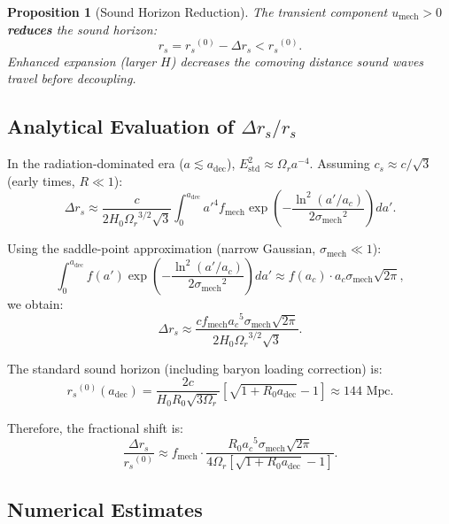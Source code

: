 \documentclass[11pt,a4paper]{article}
\newcommand{\cs}{\ensuremath{c_s}}
\newcommand{\umech}{\ensuremath{u_{\mathrm{mech}}}}
\newcommand{\fmech}{\ensuremath{f_{\mathrm{mech}}}}
\newcommand{\ac}{\ensuremath{a_c}}
\newcommand{\sigmamech}{\ensuremath{\sigma_{\mathrm{mech}}}}
\newcommand{\adec}{\ensuremath{a_{\mathrm{dec}}}}
\newcommand{\rs}{\ensuremath{r_s}}
\newcommand{\Omr}{\ensuremath{\Omega_r}}
\newtheorem{proposition}[theorem]{Proposition}
\theoremstyle{definition}
\theoremstyle{remark}
\begin{document}
\begin{proposition}[Sound Horizon Reduction]
\label{prop:rs_reduction}
The transient component $\umech > 0$ \textbf{reduces} the sound horizon:
\begin{equation}
\rs = \rs^{(0)} - \Delta\rs < \rs^{(0)}.
\end{equation}
Enhanced expansion (larger $H$) decreases the comoving distance sound waves travel before decoupling.
\end{proposition}

\subsection{Analytical Evaluation of $\Delta\rs/\rs$}
\label{sec:analytical_Deltars}

In the radiation-dominated era ($a \lesssim \adec$), $E_{\mathrm{std}}^2 \approx \Omr a^{-4}$. Assuming $\cs \approx c/\sqrt{3}$ (early times, $R \ll 1$):
\begin{equation}
\Delta\rs \approx \frac{c}{2H_0\Omr^{3/2}\sqrt{3}} \int_0^{\adec} a'^4 \fmech \exp\left( -\frac{\ln^2(a'/\ac)}{2\sigmamech^2} \right) da'.
\end{equation}

Using the saddle-point approximation (narrow Gaussian, $\sigmamech \ll 1$):
\begin{equation}
\int_0^{\adec} f(a') \exp\left( -\frac{\ln^2(a'/\ac)}{2\sigmamech^2} \right) da' \approx f(\ac) \cdot \ac \sigmamech \sqrt{2\pi},
\end{equation}
we obtain:
\begin{equation}
\Delta\rs \approx \frac{c \fmech \ac^5 \sigmamech \sqrt{2\pi}}{2H_0\Omr^{3/2}\sqrt{3}}.
\end{equation}

The standard sound horizon (including baryon loading correction) is:
\begin{equation}
\rs^{(0)}(\adec) = \frac{2c}{H_0 R_0 \sqrt{3\Omr}} \left[ \sqrt{1 + R_0\adec} - 1 \right] \approx 144 \text{ Mpc}.
\end{equation}

Therefore, the fractional shift is:
\begin{equation}
\label{eq:fractional_rs_change}
\boxed{\frac{\Delta\rs}{\rs^{(0)}} \approx \fmech \cdot \frac{R_0 \ac^5 \sigmamech \sqrt{2\pi}}{4\Omr \left[\sqrt{1+R_0\adec} - 1\right]}.}
\end{equation}

\subsection{Numerical Estimates}
\label{sec:rs_numerical}
\end{document}
